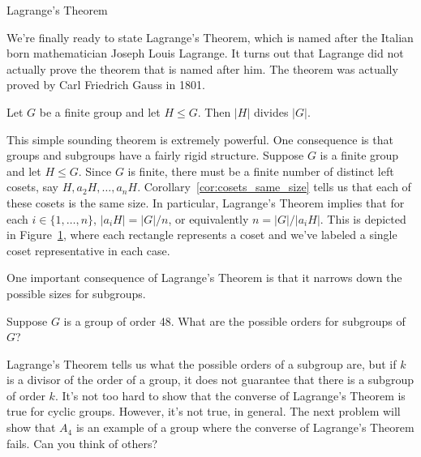 \begin{section}{Lagrange's Theorem}

We're finally ready to state Lagrange's Theorem, which is named after the Italian born mathematician Joseph Louis Lagrange.  It turns out that Lagrange did not actually prove the theorem that is named after him.  The theorem was actually proved by Carl Friedrich Gauss in 1801.

\begin{theorem}
Let $G$ be a finite group and let $H\leq G$.  Then $|H|$ divides $|G|$.
\end{theorem}

This simple sounding theorem is extremely powerful.  One consequence is that groups and subgroups have a fairly rigid structure.  Suppose $G$ is a finite group and let $H\leq G$.  Since $G$ is finite, there must be a finite number of distinct left cosets, say $H, a_2H, \ldots, a_{n}H$.  Corollary~\ref{cor:cosets_same_size} tells us that each of these cosets is the same size.  In particular, Lagrange's Theorem implies that for each $i\in\{1,\ldots, n\}$, $|a_iH|=|G|/n$, or equivalently $n=|G|/|a_iH|$.  This is depicted in Figure~\ref{fig:Lagrange}, where each rectangle represents a coset and we've labeled a single coset representative in each case.

\begin{figure}[!ht]
\centering
{}
\caption{}
\label{fig:Lagrange}
\end{figure}

One important consequence of Lagrange's Theorem is that it narrows down the possible sizes for subgroups.

\begin{exercise}
Suppose $G$ is a group of order 48.  What are the possible orders for subgroups of $G$?  
\end{exercise}

Lagrange's Theorem tells us what the possible orders of a subgroup are, but if $k$ is a divisor of the order of a group, it does not guarantee that there is a subgroup of order $k$. It's not too hard to show that the converse of Lagrange's Theorem is true for cyclic groups.  However, it's not true, in general.  The next problem will show that $A_4$ is an example of a group where the converse of Lagrange's Theorem fails.  Can you think of others?


\end{section}
